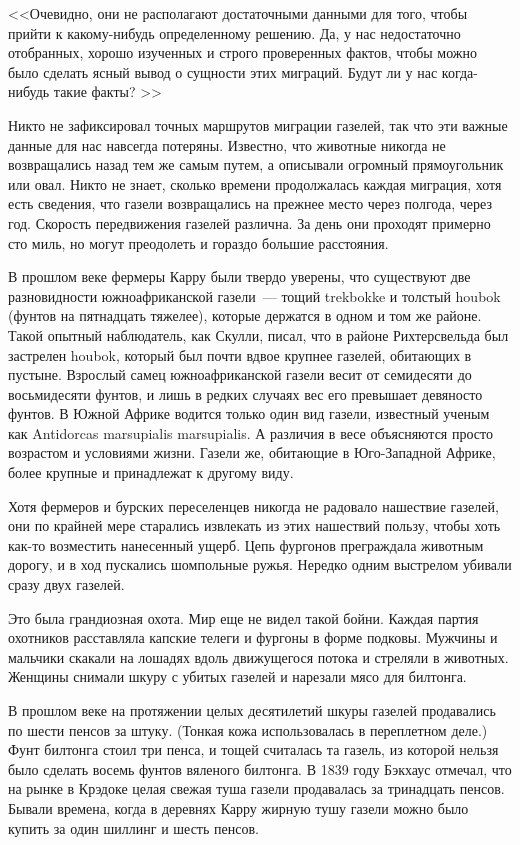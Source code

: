 \documentclass[12pt,a4paper,twoside,openany,svgnames]{memoir}
\begin{document}
<<Очевидно, они не располагают достаточными данными для того, чтобы прийти к какому-нибудь определенному решению. Да, у нас недостаточно отобранных, хорошо изученных и строго проверенных фактов, чтобы можно было сделать ясный вывод о сущности этих миграций. Будут ли у нас когда-нибудь такие факты? >>

Никто не зафиксировал точных маршрутов миграции газелей, так что эти важные данные для нас навсегда потеряны. Известно, что животные никогда не возвращались назад тем же самым путем, а описывали огромный прямоугольник или овал. Никто не знает, сколько времени продолжалась каждая миграция, хотя есть сведения, что газели возвращались на прежнее место через полгода, через год. Скорость передвижения газелей различна. За день они проходят примерно сто миль, но могут преодолеть и гораздо большие расстояния.

В прошлом веке фермеры Карру были твердо уверены, что существуют две разновидности южноафриканской газели~--- тощий trekbokke и толстый houbok (фунтов на пятнадцать тяжелее), которые держатся в одном и том же районе. Такой опытный наблюдатель, как Скулли, писал, что в районе Рихтерсвельда был застрелен houbok, который был почти вдвое крупнее газелей, обитающих в пустыне. Взрослый самец южноафриканской газели весит от семидесяти до восьмидесяти фунтов, и лишь в редких случаях вес его превышает девяносто фунтов. В Южной Африке водится только один вид газели, известный ученым как Antidorcas marsupialis marsupialis. А различия в весе объясняются просто возрастом и условиями жизни. Газели же, обитающие в Юго-Западной Африке, более крупные и принадлежат к другому виду.

Хотя фермеров и бурских переселенцев никогда не радовало нашествие газелей, они по крайней мере старались извлекать из этих нашествий пользу, чтобы хоть как-то возместить нанесенный ущерб. Цепь фургонов преграждала животным дорогу, и в ход пускались шомпольные ружья. Нередко одним выстрелом убивали сразу двух газелей.

Это была грандиозная охота. Мир еще не видел такой бойни. Каждая партия охотников расставляла капские телеги и фургоны в форме подковы. Мужчины и мальчики скакали на лошадях вдоль движущегося потока и стреляли в животных. Женщины снимали шкуру с убитых газелей и нарезали мясо для билтонга.

В прошлом веке на протяжении целых десятилетий шкуры газелей продавались по шести пенсов за штуку. (Тонкая кожа использовалась в переплетном деле.) Фунт билтонга стоил три пенса, и тощей считалась та газель, из которой нельзя было сделать восемь фунтов вяленого билтонга. В 1839 году Бэкхаус отмечал, что на рынке в Крэдоке целая свежая туша газели продавалась за тринадцать пенсов. Бывали времена, когда в деревнях Карру жирную тушу газели можно было купить за один шиллинг и шесть пенсов.
\end{document}
